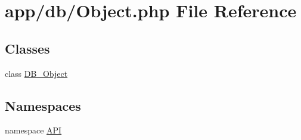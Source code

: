 \hypertarget{Object_8php}{
\section{app/db/Object.php File Reference}
\label{d7/da1/Object_8php}
}
\subsection*{Classes}
\begin{DoxyCompactItemize}
\item 
class \hyperlink{classDB__Object}{DB\_\-Object}
\end{DoxyCompactItemize}
\subsection*{Namespaces}
\begin{DoxyCompactItemize}
\item 
namespace \hyperlink{namespaceAPI}{API}
\end{DoxyCompactItemize}
